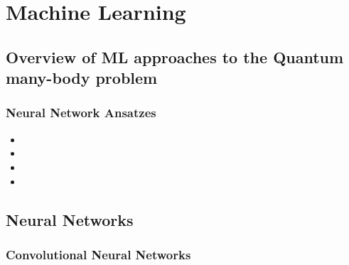 
\chapter{Machine Learning}
\label{chapter4}

\ifpdf
\graphicspath{{Chapter4/Figs/Raster/}{Chapter4/Figs/PDF/}{Chapter4/Figs/}}
\else
\graphicspath{{Chapter4/Figs/Vector/}{Chapter4/Figs/}}
\fi

\section{Overview of ML approaches to the Quantum many-body problem}
\label{subsec:ml-overview}

\subsection{Neural Network Ansatzes}
\begin{itemize}
	\item
	\item
	\item
	\item
\end{itemize}

\section{Neural Networks}

\subsection{Convolutional Neural Networks}
\label{subsubsec:ml-cnn}